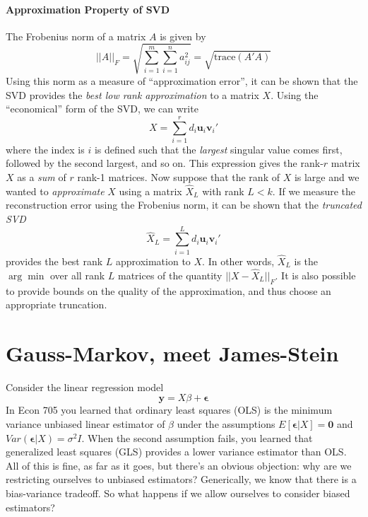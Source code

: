 \paragraph{Approximation Property of SVD} The Frobenius norm of a matrix $A$ is given by
	$$||A||_F = \sqrt{\sum_{i=1}^m \sum_{i=1}^n a_{ij}^2} = \sqrt{\mbox{trace}(A'A)}$$
Using this norm as a measure of ``approximation error'', it can be shown that the SVD provides the \emph{best low rank approximation} to a matrix $X$. 
Using the ``economical'' form of the SVD, we can write
	$$X = \sum_{i=1}^r d_i \textbf{u}_i \textbf{v}_i'$$
where the index is $i$ is defined such that the \emph{largest} singular value comes first, followed by the second largest, and so on. This expression gives the rank-$r$ matrix $X$ as a \emph{sum} of $r$ rank-1 matrices. Now suppose that the rank of $X$ is large and we wanted to \emph{approximate} $X$ using a matrix $\widehat{X}_L$ with rank $L<k$. If we measure the reconstruction error using the Frobenius norm, it can be shown that the \emph{truncated SVD}
	$$\widehat{X}_L = \sum_{i=1}^{L} d_i \textbf{u}_i \textbf{v}_i'$$ 	
provides the best rank $L$ approximation to $X$. In other words, $\widehat{X}_L$ is the $\arg \min$  over all rank $L$ matrices of the quantity $||X - \widehat{X}_L||_F$. It is also possible to provide bounds on the quality of the approximation, and thus choose an appropriate truncation. 

\section{Gauss-Markov, meet James-Stein}
Consider the linear regression model
	$$\mathbf{y} = X\beta + \boldsymbol{\epsilon}$$
In Econ 705 you learned that ordinary least squares (OLS) is the minimum variance unbiased linear estimator of $\beta$ under the assumptions $E[\boldsymbol{\epsilon}|X] = \mathbf{0}$ and $Var(\mathbf{\epsilon}|X) = \sigma^2 I$. When the second assumption fails, you learned that generalized least squares (GLS) provides a lower variance estimator than OLS. All of this is fine, as far as it goes, but there's an obvious objection: why are we restricting ourselves to unbiased estimators? Generically, we know that there is a bias-variance tradeoff. So what happens if we allow ourselves to consider biased estimators? 



